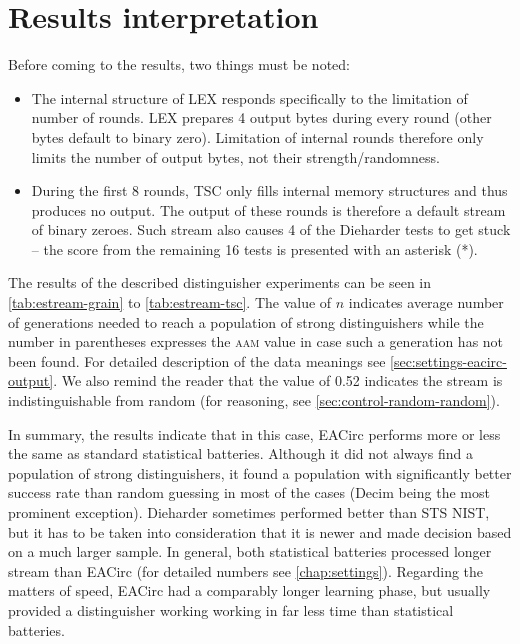 \documentclass[12pt,oneside]{fithesis2}
\newcommand{\squarebullet}{\textcolor{black}{\raisebox{0.15em}{\rule{4pt}{4pt}}}}
\newenvironment{myItemize}{
  \begin{itemize}[leftmargin=2em,rightmargin=1em,itemsep=\parskip ,parsep=0em,topsep=0em,partopsep=0em]
  \renewcommand{\labelitemi}{\squarebullet}
  \renewcommand{\labelitemii}{$\diamond$}
}{
  \end{itemize}
}
\begin{document}
\section{Results interpretation}
\label{sec:estream-results}

Before coming to the results, two things must be noted:
\begin{myItemize}
\item The internal structure of LEX responds specifically to the limitation of number of rounds.
LEX prepares 4 output bytes during every round (other bytes default to binary zero). 
Limitation of internal rounds therefore only limits the number
of output bytes, not their strength/randomness.
\item During the first 8 rounds, TSC only fills internal memory structures and thus produces no output. The output of these rounds
is therefore a default stream of binary zeroes. Such stream also causes 4 of the Dieharder tests to get stuck --
the score from the remaining 16 tests is presented with an asterisk (*).
\end{myItemize}

\noindent
The results of the described distinguisher experiments can be seen in \autoref{tab:estream-grain} to
\autoref{tab:estream-tsc}. The value of $n$ indicates average number of generations needed to reach a population of
strong distinguishers while the number in parentheses expresses the \textsc{aam} value in case such a generation has not been
found. For detailed description of the data meanings see \autoref{sec:settings-eacirc-output}. We also remind the reader
that the value of 0.52 indicates the stream is indistinguishable from random (for reasoning, see \autoref{sec:control-random-random}).

In summary, the results indicate that in this case, EACirc performs more or less the same as standard statistical batteries.
Although it did not always find a population of strong distinguishers, it found a population with significantly better
success rate than random guessing in most of the cases (Decim being the most prominent exception).
Dieharder sometimes performed better than STS NIST, but it has to be taken into consideration that it is newer
and made decision based on a much larger sample. In general, both statistical batteries processed longer stream than EACirc
(for detailed numbers see \autoref{chap:settings}). Regarding the matters of speed, EACirc had a comparably longer learning phase,
but usually provided a distinguisher working working in far less time than statistical batteries.
\medskip
\end{document}
